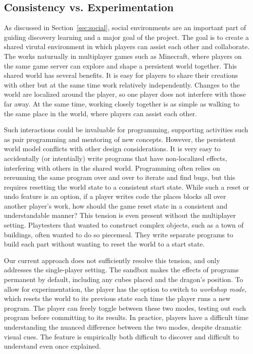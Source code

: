 \documentclass{sig-alternate}
\begin{document}
\subsection{Consistency vs. Experimentation}
\label{sec:multiplayer}

As discussed in Section~\ref{sec:social}, social environments are an important part of guiding discovery learning and a major goal of the project.
The goal is to create a shared virutal environment in which players can assist each other and collaborate.
The works naturually in multiplayer games such as Minecraft, where players on the same game server can explore and shape a persistent world together.
This shared world has several benefits.
It is easy for players to share their creations with other but at the same time work relatively independently.
Changes to the world are localized around the player, so one player does not interfere with those far away.
At the same time, working closely together is as simple as walking to the same place in the world, where players can assist each other.

Such interactions could be invaluable for programming, supporting activities such as pair programming and mentoring of new concepts.
However, the persistent world model conflicts with other design considerations.
It is very easy to accidentally (or intentially) write programs that have non-localized effects, interfering with others in the shared world.
Programming often relies on rereunning the same program over and over to iterate and find bugs, but this requires resetting the world state to a consistent start state.
While such a reset or undo feature is an option, if a player writes code the places blocks all over another player's work, how should the game reset state in a consistent and understandable manner?
This tension is even present without the multiplayer setting.
Playtesters that wanted to construct complex objects, such as a town of buildings, often wanted to do so piecemeal. They write separate programs to build each part without wanting to reset the world to a start state.

Our current approach does not sufficiently resolve this tension, and only addresses the single-player setting.
The sandbox makes the effects of programs permanent by default, including any cubes placed and the dragon's position.
To allow for experimentation, the player has the option to switch to \emph{workshop mode}, which resets the world to its previous state each time the player runs a new program. 
The player can freely toggle between these two modes, testing out each program before committing to its results. 
In practice, players have a difficult time understanding the nuanced difference between the two modes, despite dramatic visual cues.
The feature is empirically both difficult to discover and difficult to understand even once explained.
\end{document}
